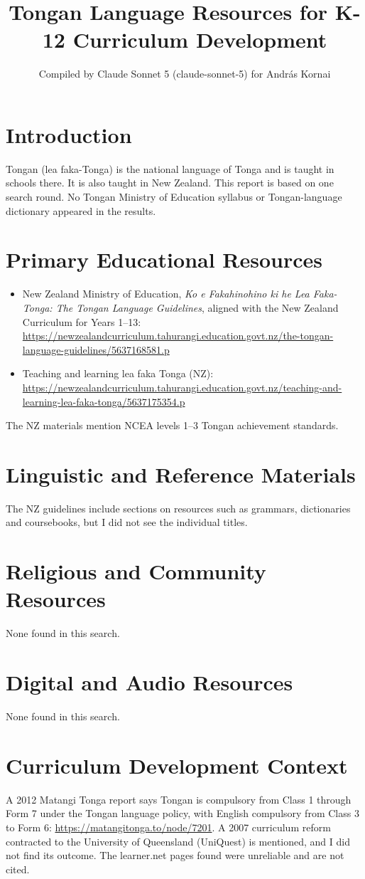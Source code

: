 \documentclass[12pt]{article}
\title{Tongan Language Resources for K-12 Curriculum Development}
\author{Compiled by Claude Sonnet 5 (claude-sonnet-5) for Andr\'as Kornai}
\date{}
\begin{document}
\maketitle

\section{Introduction}
Tongan (lea faka-Tonga) is the national language of Tonga and is taught in schools there. It is also taught in New Zealand. This report is based on one search round. No Tongan Ministry of Education syllabus or Tongan-language dictionary appeared in the results.

\section{Primary Educational Resources}
\begin{itemize}
\item New Zealand Ministry of Education, \emph{Ko e Fakahinohino ki he Lea Faka-Tonga: The Tongan Language Guidelines}, aligned with the New Zealand Curriculum for Years 1--13: \url{https://newzealandcurriculum.tahurangi.education.govt.nz/the-tongan-language-guidelines/5637168581.p}
\item Teaching and learning lea faka Tonga (NZ): \url{https://newzealandcurriculum.tahurangi.education.govt.nz/teaching-and-learning-lea-faka-tonga/5637175354.p}
\end{itemize}
The NZ materials mention NCEA levels 1--3 Tongan achievement standards.

\section{Linguistic and Reference Materials}
The NZ guidelines include sections on resources such as grammars, dictionaries and coursebooks, but I did not see the individual titles.

\section{Religious and Community Resources}
None found in this search.

\section{Digital and Audio Resources}
None found in this search.

\section{Curriculum Development Context}
A 2012 Matangi Tonga report says Tongan is compulsory from Class 1 through Form 7 under the Tongan language policy, with English compulsory from Class 3 to Form 6: \url{https://matangitonga.to/node/7201}. A 2007 curriculum reform contracted to the University of Queensland (UniQuest) is mentioned, and I did not find its outcome. The learner.net pages found were unreliable and are not cited.
\end{document}
